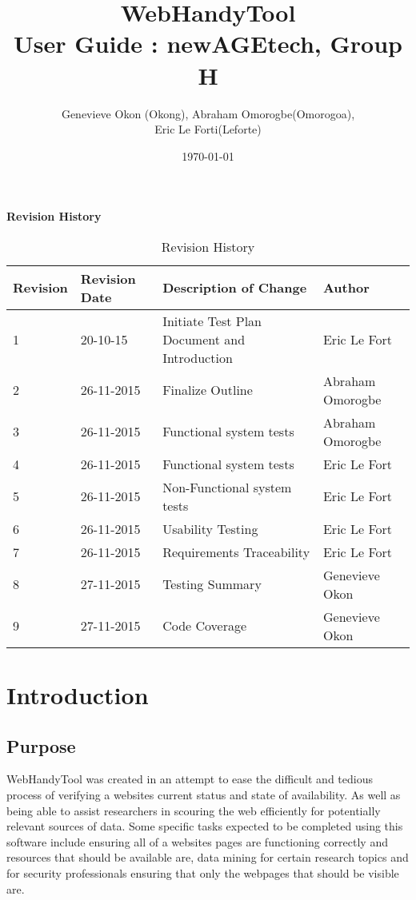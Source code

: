 \documentclass[12pt, titlepage]{article}
\begin{document}
\title{WebHandyTool \\
 User Guide : newAGEtech, Group H }
\author{Genevieve Okon (Okong), Abraham Omorogbe(Omorogoa),\\
 Eric Le Forti(Leforte)}
\date{\today}
\maketitle

\tableofcontents
\listoftables
\pagebreak

\begin{center}\textbf{Revision History}\end{center}
\begin{table}[h!]
\centering
	\begin{tabular}{| p{1.5cm} | p{2.5cm} | p{7cm} |p{3cm} |}    \hline
	Revision  &Revision Date &Description of Change &Author\\ \hline
	1& 20-10-15 &Initiate Test Plan Document  and Introduction&Eric Le Fort\\ \hline
	2&26-11-2015&Finalize Outline & Abraham Omorogbe\\ \hline	
3&26-11-2015&Functional system tests& Abraham Omorogbe\\ \hline
4&26-11-2015&Functional system tests& Eric Le Fort\\ \hline
5&26-11-2015&Non-Functional system tests& Eric Le Fort\\ \hline
6 &26-11-2015&Usability Testing & Eric Le Fort\\ \hline
7& 26-11-2015& Requirements Traceability & Eric Le Fort\\ \hline
8& 27-11-2015 &Testing Summary& Genevieve Okon\\ \hline
9& 27-11-2015 &Code Coverage& Genevieve Okon\\ \hline

	
       \end{tabular}
       \caption{Revision History}
       \label{table:Revision History}
\end{table}
\pagebreak
\section{Introduction}
\subsection{Purpose}
WebHandyTool was created in an attempt to ease the difficult and tedious process of verifying a websites current status and state of availability. As well as being able to assist researchers in scouring the web efficiently for potentially relevant sources of data. Some specific tasks expected to be completed using this software include ensuring all of a websites pages are functioning correctly and resources that should be available are, data mining for certain research topics and for security professionals ensuring that only the webpages that should be visible are. 
\end{document}
